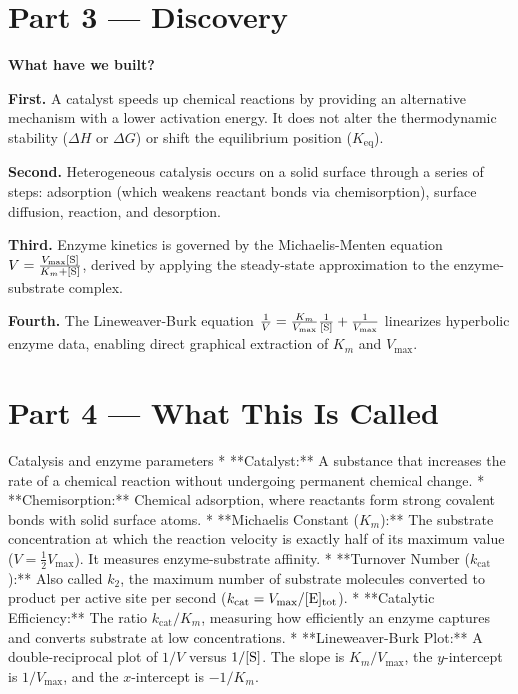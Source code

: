 \documentclass[12pt, a4paper]{book}
\begin{document}
\newpage

\section{Part 3 --- Discovery}

\begin{discoverybox}
\textbf{What have we built?}

\textbf{First.} A catalyst speeds up chemical reactions by providing an alternative mechanism with a lower activation energy. It does not alter the thermodynamic stability ($\Delta H$ or $\Delta G$) or shift the equilibrium position ($K_{\text{eq}}$).

\textbf{Second.} Heterogeneous catalysis occurs on a solid surface through a series of steps: adsorption (which weakens reactant bonds via chemisorption), surface diffusion, reaction, and desorption.

\textbf{Third.} Enzyme kinetics is governed by the Michaelis-Menten equation $V = \frac{V_{\text{max}}[\ce{S}]}{K_m + [\ce{S}]}$, derived by applying the steady-state approximation to the enzyme-substrate complex.

\textbf{Fourth.} The Lineweaver-Burk equation $\frac{1}{V} = \frac{K_m}{V_{\text{max}}}\frac{1}{[\ce{S}]} + \frac{1}{V_{\text{max}}}$ linearizes hyperbolic enzyme data, enabling direct graphical extraction of $K_m$ and $V_{\text{max}}$.
\end{discoverybox}

\newpage

\section{Part 4 --- What This Is Called}

\begin{namedconcept}{Catalysis and enzyme parameters}
* **Catalyst:** A substance that increases the rate of a chemical reaction without undergoing permanent chemical change.
* **Chemisorption:** Chemical adsorption, where reactants form strong covalent bonds with solid surface atoms.
* **Michaelis Constant ($K_m$):** The substrate concentration at which the reaction velocity is exactly half of its maximum value ($V = \frac{1}{2}V_{\text{max}}$). It measures enzyme-substrate affinity.
* **Turnover Number ($k_{\text{cat}}$):** Also called $k_2$, the maximum number of substrate molecules converted to product per active site per second ($k_{\text{cat}} = V_{\text{max}} / [\ce{E}]_{\text{tot}}$).
* **Catalytic Efficiency:** The ratio $k_{\text{cat}}/K_m$, measuring how efficiently an enzyme captures and converts substrate at low concentrations.
* **Lineweaver-Burk Plot:** A double-reciprocal plot of $1/V$ versus $1/[\ce{S}]$. The slope is $K_m/V_{\text{max}}$, the $y$-intercept is $1/V_{\text{max}}$, and the $x$-intercept is $-1/K_m$.
\end{namedconcept}
\end{document}
